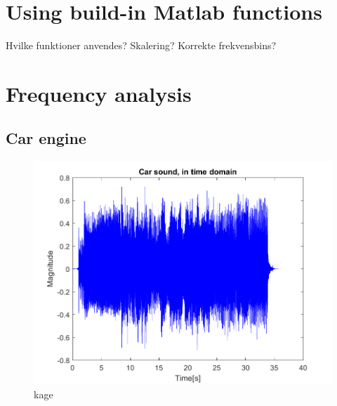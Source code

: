 

\section{Using build-in Matlab functions}
Hvilke funktioner anvendes?
Skalering?
Korrekte frekvensbins?



\section{Frequency analysis}
\label{sec:analysis}
\subsection{Car engine}

\begin{figure}
	\includegraphics[width=\textwidth]{code/Car_figure1.png}
	\caption{kage}
	\label{fig:Car_figure1:1}
\end{figure}

